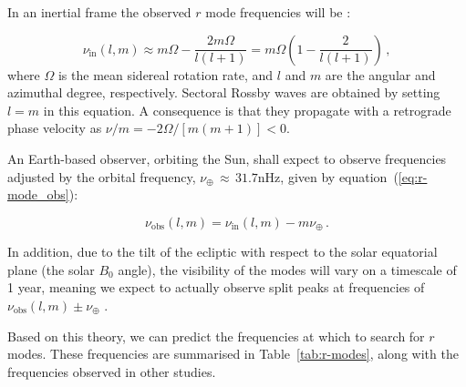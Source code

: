 In an inertial frame the observed $r$ mode frequencies will be \citep{lanza_sectoral_2019}:

\begin{equation}
\nu_{\mathrm{in}}(l,m) \approx m\Omega - \frac{2m\Omega}{l(l + 1)}  = m\Omega \left(1 - \frac{2}{l(l + 1)}\right) \, ,
\label{eq:r-mode}
\end{equation}
%
where $\Omega$ is the mean sidereal rotation rate, and $l$ and $m$ are the angular and azimuthal degree, respectively. Sectoral Rossby waves are obtained by setting $l=m$ in this equation. A consequence is that they propagate with a retrograde phase velocity as $\nu / m = -2 \Omega/[m(m + 1)] < 0$.

An Earth-based observer, orbiting the Sun, shall expect to observe frequencies adjusted by the orbital frequency, $\nu_\oplus \, \approx \, 31.7$nHz, given by equation~(\ref{eq:r-mode_obs}):

\begin{equation}
\nu_{\mathrm{obs}}(l,m) = \nu_{\mathrm{in}}(l,m) - m\nu_{\oplus} \, .
\label{eq:r-mode_obs}
\end{equation}

In addition, due to the tilt of the ecliptic with respect to the solar equatorial plane (the solar $B_0$ angle), the visibility of the modes will vary on a timescale of 1 year, meaning we expect to actually observe split peaks at frequencies of $\nu_{\mathrm{obs}}(l,m) \pm \nu_{\oplus}$ \citep{lanza_sectoral_2019}.

Based on this theory, we can predict the frequencies at which to search for $r$ modes. These frequencies are summarised in Table~\ref{tab:r-modes}, along with the frequencies observed in other studies. %

\vspace{1em}

